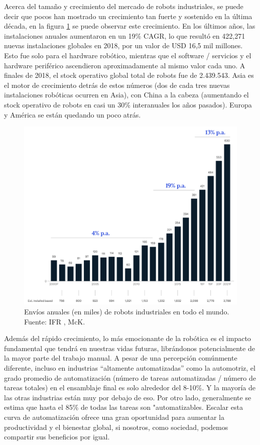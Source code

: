     Acerca del tamaño y crecimiento del mercado de robots industriales, se puede decir que pocos han mostrado un crecimiento tan fuerte y sostenido en la última década, en la figura \ref{f:Cap2_general_envios_anuales} se puede observar este crecimiento. En los últimos años, las instalaciones anuales aumentaron en un 19\% CAGR, lo que resultó en 422,271 nuevas instalaciones globales en 2018, por un valor de USD 16,5 mil millones. Esto fue solo para el hardware robótico, mientras que el software / servicios y el hardware periférico ascendieron aproximadamente al mismo valor cada uno. A finales de 2018, el stock operativo global total de robots fue de 2.439.543. Asia es el motor de crecimiento detrás de estos números (dos de cada tres nuevas instalaciones robóticas ocurren en Asia), con China a la cabeza (aumentando el stock operativo de robots en casi un 30\% interanuales los años pasados). Europa y América se están quedando un poco atrás. 
    \begin{figure}[H]
        \centering
        \includegraphics[width=0.67\linewidth]{Main/Chapter2/Images2/envios-anuales-robots.png}
        \caption{Envíos anuales (en miles) de robots industriales en todo el mundo. Fuente: IFR , McK.}
        \label{f:Cap2_general_envios_anuales}
    \end{figure}
    Además del rápido crecimiento, lo más emocionante de la robótica es el impacto fundamental que tendrá en nuestras vidas futuras, librándonos potencialmente de la mayor parte del trabajo manual. A pesar de una percepción comúnmente diferente, incluso en industrias “altamente automatizadas” como la automotriz, el grado promedio de automatización (número de tareas automatizadas / número de tareas totales) en el ensamblaje final es solo alrededor del 8-10\%. Y la mayoría de las otras industrias están muy por debajo de eso. Por otro lado, generalmente se estima que hasta el 85\% de todas las tareas son "automatizables. Escalar esta curva de automatización ofrece una gran oportunidad para aumentar la productividad y el bienestar global, si nosotros, como sociedad, podemos compartir sus beneficios por igual.
    

